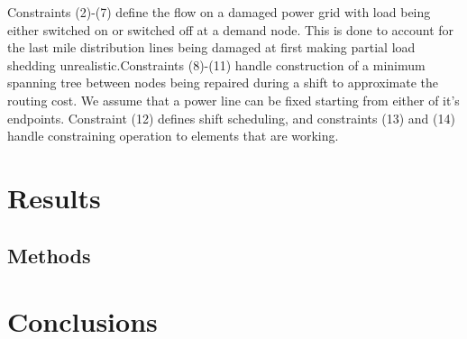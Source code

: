 \documentclass[10pt]{article}
\begin{document}
 Constraints (2)-(7) define the flow on a damaged power grid with load being either switched on or switched off at a demand node. This is done to account for the last mile distribution lines being damaged at first making partial load shedding unrealistic.Constraints (8)-(11) handle construction of a minimum spanning tree between nodes being repaired during a shift to approximate the routing cost. We assume that a power line can be fixed starting from either of it's endpoints. Constraint (12) defines shift scheduling, and constraints (13) and (14) handle constraining operation to elements that are working.
\section{\large{Results}}
\vspace*{-12pt}
\subsection{Methods}
 \vspace*{-12pt}


\section{\large{Conclusions}}
\label{sec:issues}
\vspace*{-12pt}



\end{document}
